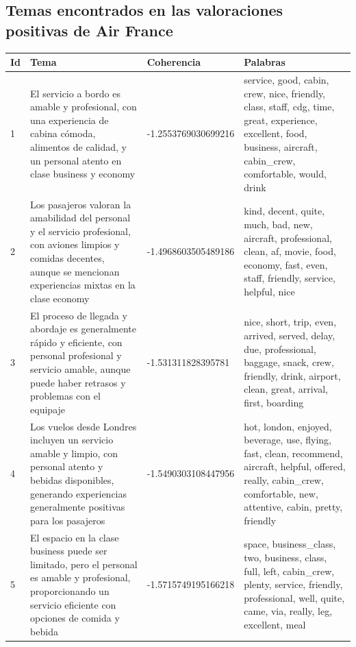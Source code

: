 \documentclass{report}
\begin{document}
{{\begin{longtable}{|c|c|c|c|}
                \end{longtable}
            \clearpage\subsection{Temas encontrados en las valoraciones positivas de Air France}
                \label{tab:temas_air_france_positivas}
                \begin{longtable}{|p{1cm}|p{4cm}|p{4cm}|p{6cm}|}
                    \hline
                    \textbf{Id} & \textbf{Tema} & \textbf{Coherencia} & \textbf{Palabras} \\
                    \hline
                    1 & El servicio a bordo es amable y profesional, con una experiencia de cabina cómoda, alimentos de calidad, y un personal atento en clase business y economy & -1.2553769030699216 & service, good, cabin, crew, nice, friendly, class, staff, cdg, time, great, experience, excellent, food, business, aircraft, cabin\_crew, comfortable, would, drink \\
                    \hline
                    2 & Los pasajeros valoran la amabilidad del personal y el servicio profesional, con aviones limpios y comidas decentes, aunque se mencionan experiencias mixtas en la clase economy & -1.4968603505489186 & kind, decent, quite, much, bad, new, aircraft, professional, clean, af, movie, food, economy, fast, even, staff, friendly, service, helpful, nice \\
                    \hline
                    3 & El proceso de llegada y abordaje es generalmente rápido y eficiente, con personal profesional y servicio amable, aunque puede haber retrasos y problemas con el equipaje & -1.531311828395781 & nice, short, trip, even, arrived, served, delay, due, professional, baggage, snack, crew, friendly, drink, airport, clean, great, arrival, first, boarding \\
                    \hline
                    4 & Los vuelos desde Londres incluyen un servicio amable y limpio, con personal atento y bebidas disponibles, generando experiencias generalmente positivas para los pasajeros & -1.5490303108447956 & hot, london, enjoyed, beverage, use, flying, fast, clean, recommend, aircraft, helpful, offered, really, cabin\_crew, comfortable, new, attentive, cabin, pretty, friendly \\
                    \hline
                    5 & El espacio en la clase business puede ser limitado, pero el personal es amable y profesional, proporcionando un servicio eficiente con opciones de comida y bebida & -1.5715749195166218 & space, business\_class, two, business, class, full, left, cabin\_crew, plenty, service, friendly, professional, well, quite, came, via, really, leg, excellent, meal \\

\end{longtable}}}
\end{document}
